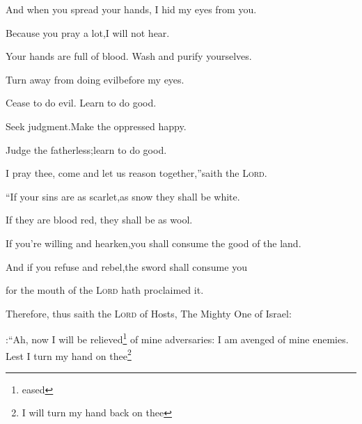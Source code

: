 
\begin{inparaenum}
  
  \pb {} And when you spread your hands,%
  \pa I hid my eyes from you.%
  
  \pc Because you pray a lot,\pa I will not hear.%
  
  \pc Your hands are full of blood.\pa {} Wash and purify yourselves.%
  
  \pc Turn away from doing evil\pa before my eyes.%
  
  \pc Cease to do evil.\pa {} Learn to do good.%
  
  \pc Seek judgment.\pa Make the oppressed happy.%
  
  \pc Judge the fatherless;\pa learn to do good.%
  
  \pb {} I pray thee, come and let us reason together,''\pa saith the \textsc{Lord}.%

  \pc ``If your sins are as scarlet,\pa as snow they shall be white.%

  \pc If they are blood red,%
  \pa they shall be as wool.%
  
  \pb {} If you're willing and hearken,\pa you shall consume the good of the land.%
  
  \pb {} And if you refuse and rebel,\pa the sword shall consume you%
  
  \pc for the mouth of the \textsc{Lord} hath proclaimed it.%
  
   Therefore, thus saith the \textsc{Lord} of Hosts, The Mighty One of Israel:\smallskip%

:``Ah, now I will be relieved\footnote{eased} of mine adversaries: I am avenged of mine enemies.%
   Lest I turn my hand on thee\footnote{I will turn my hand back on thee}%


\end{inparaenum}
